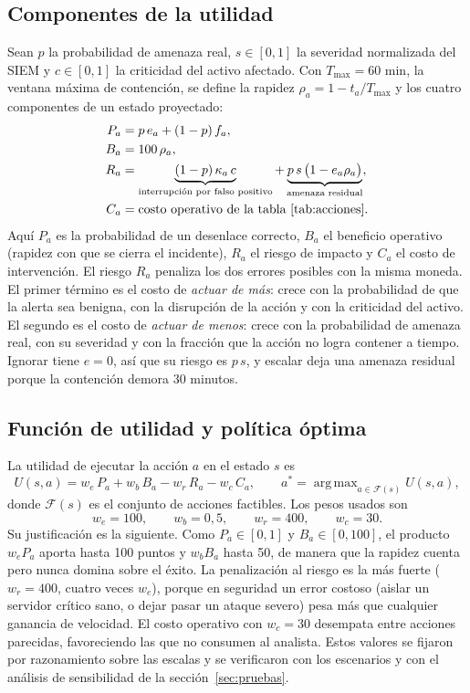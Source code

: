 \documentclass[11pt,a4paper]{article}
\DeclareMathOperator*{\argmax}{arg\,max}
\begin{document}
\subsection{Componentes de la utilidad}

Sean $p$ la probabilidad de amenaza real, $s\in[0,1]$ la severidad normalizada del SIEM y $c\in[0,1]$ la criticidad del activo afectado. Con $T_{\max}=60$ min, la ventana máxima de contención, se define la rapidez $\rho_a=1-t_a/T_{\max}$ y los cuatro componentes de un estado proyectado:
\begin{align}
P_a &= p\,e_a+(1-p)\,f_a, \\
B_a &= 100\,\rho_a, \\
R_a &= \underbrace{(1-p)\,\kappa_a\,c}_{\text{interrupción por falso positivo}}+\underbrace{p\,s\,\bigl(1-e_a\rho_a\bigr)}_{\text{amenaza residual}}, \\
C_a &= \text{costo operativo de la tabla~\ref{tab:acciones}.}
\end{align}
Aquí $P_a$ es la probabilidad de un desenlace correcto, $B_a$ el beneficio operativo (rapidez con que se cierra el incidente), $R_a$ el riesgo de impacto y $C_a$ el costo de intervención.
El riesgo $R_a$ penaliza los dos errores posibles con la misma moneda. El primer término es el costo de \emph{actuar de más}: crece con la probabilidad de que la alerta sea benigna, con la disrupción de la acción y con la criticidad del activo. El segundo es el costo de \emph{actuar de menos}: crece con la probabilidad de amenaza real, con su severidad y con la fracción que la acción no logra contener a tiempo. Ignorar tiene $e=0$, así que su riesgo es $p\,s$, y escalar deja una amenaza residual porque la contención demora 30 minutos.

\subsection{Función de utilidad y política óptima}

La utilidad de ejecutar la acción $a$ en el estado $s$ es
\begin{equation}
U(s,a)=w_e\,P_a+w_b\,B_a-w_r\,R_a-w_c\,C_a,
\qquad a^*=\argmax_{a\in\mathcal{F}(s)}U(s,a),
\end{equation}
donde $\mathcal{F}(s)$ es el conjunto de acciones factibles. Los pesos usados son
\[
w_e=100,\qquad w_b=0{,}5,\qquad w_r=400,\qquad w_c=30.
\]
Su justificación es la siguiente. Como $P_a\in[0,1]$ y $B_a\in[0,100]$, el producto $w_eP_a$ aporta hasta 100 puntos y $w_bB_a$ hasta 50, de manera que la rapidez cuenta pero nunca domina sobre el éxito. La penalización al riesgo es la más fuerte ($w_r=400$, cuatro veces $w_e$), porque en seguridad un error costoso (aislar un servidor crítico sano, o dejar pasar un ataque severo) pesa más que cualquier ganancia de velocidad. El costo operativo con $w_c=30$ desempata entre acciones parecidas, favoreciendo las que no consumen al analista. Estos valores se fijaron por razonamiento sobre las escalas y se verificaron con los escenarios y con el análisis de sensibilidad de la sección~\ref{sec:pruebas}.
\end{document}
